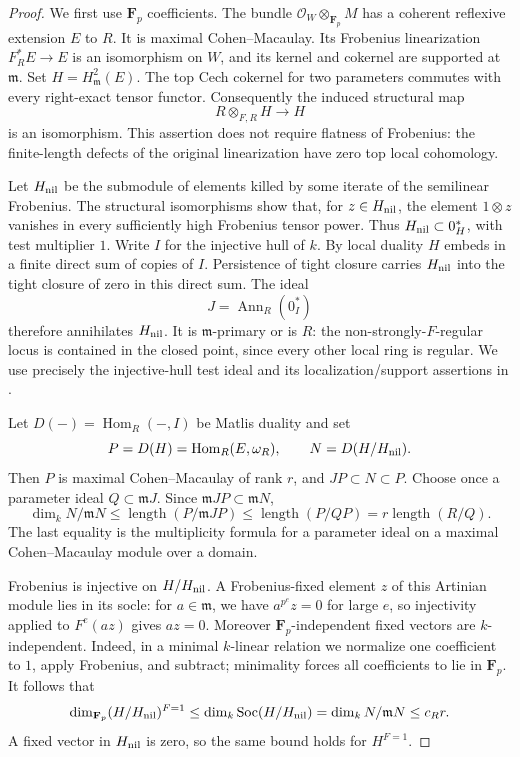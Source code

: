 \begin{proof}
We first use $\mathbf F_p$ coefficients. The bundle
$\mathcal O_W\otimes_{\mathbf F_p}M$ has a coherent reflexive extension
$E$ to $R$. It is maximal Cohen--Macaulay. Its Frobenius linearization
$F_R^*E\to E$ is an isomorphism on $W$, and its kernel and cokernel
are supported at $\mathfrak m$. Set $H=H^2_{\mathfrak m}(E)$. The top
Cech cokernel for two parameters commutes with every right-exact tensor
functor. Consequently the induced structural map
\[
 R\otimes_{F,R}H\longrightarrow H
\]
is an isomorphism. This assertion does not require flatness of Frobenius:
the finite-length defects of the original linearization have zero top
local cohomology.

Let $H_{\rm nil}$ be the submodule of elements killed by some iterate of
the semilinear Frobenius. The structural isomorphisms show that, for
$z\in H_{\rm nil}$, the element $1\otimes z$ vanishes in every
sufficiently high Frobenius tensor power. Thus $H_{\rm nil}\subset
0_H^*$, with test multiplier $1$. Write $I$ for the injective hull of
$k$. By local duality $H$ embeds in a finite direct sum of copies of
$I$. Persistence of tight closure carries $H_{\rm nil}$ into the
tight closure of zero in this direct sum. The ideal
\[
 J=\operatorname{Ann}_R(0_I^*)
\]
therefore annihilates $H_{\rm nil}$. It is $\mathfrak m$-primary or is
$R$: the non-strongly-$F$-regular locus is contained in the closed point,
since every other local ring is regular. We use precisely the
injective-hull test ideal and its localization/support assertions in
\citet[Theorem 7.1(1), (2), (5)]{C_LyubeznikSmith2001}.

Let $D(-)=\operatorname{Hom}_R(-,I)$ be Matlis duality and set
\[
 P=D(H)=\operatorname{Hom}_R(E,\omega_R),\qquad
 N=D(H/H_{\rm nil}).
\]
Then $P$ is maximal Cohen--Macaulay of rank $r$, and
$JP\subset N\subset P$. Choose once a parameter ideal
$Q\subset\mathfrak mJ$. Since $\mathfrak mJP\subset\mathfrak mN$,
\[
 \dim_k N/\mathfrak mN
 \le \operatorname{length}(P/\mathfrak mJP)
 \le \operatorname{length}(P/QP)
 =r\operatorname{length}(R/Q).
\]
The last equality is the multiplicity formula for a parameter ideal on
a maximal Cohen--Macaulay module over a domain.

Frobenius is injective on $H/H_{\rm nil}$. A Frobenius-fixed element
$z$ of this Artinian module lies in its socle: for $a\in\mathfrak m$,
we have $a^{p^e}z=0$ for large $e$, so injectivity applied to
$F^e(az)$ gives $az=0$. Moreover $\mathbf F_p$-independent fixed vectors
are $k$-independent. Indeed, in a minimal $k$-linear relation we normalize
one coefficient to $1$, apply Frobenius, and subtract; minimality forces
all coefficients to lie in $\mathbf F_p$. It follows that
\[
 \dim_{\mathbf F_p}(H/H_{\rm nil})^{F=1}
 \le \dim_k\operatorname{Soc}(H/H_{\rm nil})
 =\dim_k N/\mathfrak mN\le c_Rr.
\]
A fixed vector in $H_{\rm nil}$ is zero, so the same bound holds for
$H^{F=1}$.


\end{proof}
